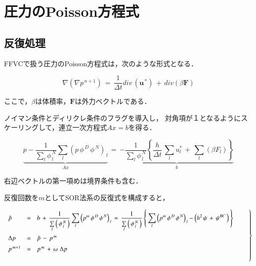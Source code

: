 \graphicspath{{./fig_EBCS/}}
%
\section{圧力のPoisson方程式}

\subsection{反復処理}

FFVCで扱う圧力のPoisson方程式は，次のような形式となる．

\begin{equation}
\nabla \left( \nabla p^{\,n+1} \right) \,=\, \frac{1}{\Delta t} div\, ( \bm{u}^{\,*}) \,+\, div( \beta \bm{F} )
\label{eq:Poisson_ffvc}
\end{equation}


\noindent ここで，$\beta$は体積率，$\bm{F}$は外力ベクトルである．

ノイマン条件とディリクレ条件のフラグを導入し，
対角項が１となるようにスケーリングして，連立一次方程式$Ax = b$を得る．

\begin{equation}
\underbrace{ p  -  \frac{1}{\sum \limits_l \phi^{\,N}_{\,l}} \sum \limits_l {\left( p \,\phi^{\,D} \,\phi^{\,N} \right)}_{\,l} } \limits_{A x }
\,=\,
 \displaystyle { 
\underbrace{ -
\frac{1}{\sum \limits_l \phi^{\,N}_{\,l}} 
\left\{ 
\frac{h}{\Delta t} \,\sum \limits_l u^*_l \,+\, \sum \limits_l (\beta F_l)
\right\}
} \limits_{ b }
}
\label{eq:ebcs_poisson-discrete}
\end{equation}

\noindent 右辺ベクトルの第一項めは境界条件も含む．


反復回数を$m$としてSOR法系の反復式を構成すると，

\begin{equation}
\left.
\begin{array}{lll}
\vspace{2mm}
\tilde{p} & = & \displaystyle {  b \, + \,
 \frac{1}{\sum \limits_l \left( \, \phi^{\,N}_{\,l} \, \right)} \sum \limits_l {\left( p^m \,\phi^{\,D} \,\phi^{\,N}\right)}_{\,l} 
 \,=\,
\frac{1}{\sum \limits_l \left( \, \phi^{\,N}_{\,l} \, \right)} 
\left \{ \,
\sum \limits_l {\left( p^m \,\phi^{\,D} \,\phi^{\,N}\right)}_{\,l} 
- \left( h^2 \,\psi \,+\,  \psi^{BC} \, \right)
\, \right \} } \\
\vspace{2mm}
\Delta p & = & \tilde{p} \,-\, p^{\,m} \\
\vspace{5mm}
p^{\,m+1} & = & p^{\,m} \,+\, \omega\, \,\Delta p \\

\end{array} \qquad \right \}
\label{eq:poisson_iteration}
\end{equation}



